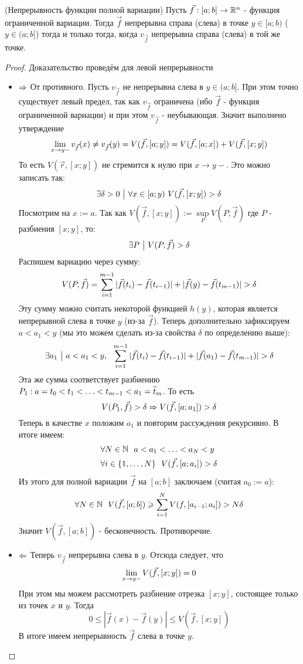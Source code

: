 \begin{theorem} (Непрерывность функции полной вариации)
	Пусть $\vec{f}: [a; b] \to \mathbb{R}^n$ - функция ограниченной вариации. Тогда $\vec{f}$ непрерывна справа (слева) в точке $y \in [a; b)$ ($y \in (a; b]$) тогда и только тогда, когда $v_{\vec{f}}$ непрерывна справа (слева) в той же точке.
\end{theorem}

\begin{proof}
	Доказательство проведём для левой непрерывности
	\begin{itemize}
		\item $\Rightarrow$ От противного. Пусть $v_{\vec{f}}$ не непрерывна слева в $y \in (a; b]$. При этом точно существует левый предел, так как $v_{\vec{f}}$ ограничена (ибо $\vec{f}$ - функция ограниченной вариации) и при этом $v_{\vec{f}}$ - неубывающая. Значит выполнено утверждение
		\[
			\lim\limits_{x \to y-} v_{\vec{f}}(x) \neq v_{\vec{f}}(y) = V(\vec{f}, [a; y]) = V(\vec{f}, [a; x]) + V(\vec{f}, [x; y])
		\]
		То есть $V(\vec{r}, [x; y])$ не стремится к нулю при $x \to y-$. Это можно записать так:
		\[
			\exists \delta > 0 \ \big|\  \forall x \in [a; y)\ V(\vec{f}, [x; y]) > \delta
		\]
		Посмотрим на $x := a$. Так как $V(\vec{f}, [x; y]) := \sup\limits_{P} V(P, \vec{f})$ где $P$ - разбиения $[x; y]$, то:
		\[
			\exists P \ \big|\  V(P, \vec{f}) > \delta
		\]
		Распишем вариацию через сумму:
		\[
			V(P, \vec{f}) = \sum\limits_{i = 1}^{m - 1} |\vec{f}(t_i) - \vec{f}(t_{i - 1})| + |\vec{f}(y) - \vec{f}(t_{m - 1})| > \delta
		\]
		Эту сумму можно считать некоторой функцией $h(y)$, которая является непрерывной слева в точке $y$ (из-за $\vec{f}$). Теперь дополнительно зафиксируем $a < a_1 < y$ (мы это можем сделать из-за свойства $\delta$ по определению выше):
		\[
			\exists a_1 \ \big|\  a < a_1 < y,\ \ \sum\limits_{i = 1}^{m - 1} |\vec{f}(t_i) - \vec{f}(t_{i - 1})| + |\vec{f}(a_1) - \vec{f}(t_{m - 1})| > \delta
		\]
		Эта же сумма соответствует разбиению $P_1: a = t_0 < t_1 < \ldots < t_{m - 1} < a_1 = \widetilde{t}_m$. То есть
		\[
			V(P_1, \vec{f}) > \delta \Rightarrow V(\vec{f}, [a; a_1]) > \delta
		\]
		Теперь в качестве $x$ положим $a_1$ и повторим рассуждения рекурсивно. В итоге имеем:
		\begin{align*}
			&{\forall N \in \mathbb{N}\ \ a < a_1 < \ldots < a_N < y}
			\\
			&{\forall i \in \{1, \ldots, N\}\ \ V(\vec{f}, [a; a_i]) > \delta}
		\end{align*}
		Из этого для полной вариации $\vec{f}$ на $[a; b]$ заключаем (считая $a_0 := a$):
		\[
			\forall N \in \mathbb{N}\ \ V(\vec{f}, [a; b]) \geqslant \sum\limits_{i = 1}^N V(f, [a_{i - 1}; a_i]) > N\delta
		\]
		Значит $V(\vec{f}, [a; b])$ - бесконечность. Противоречие.
		
		\item $\Leftarrow$ Теперь $v_{\vec{f}}$ непрерывна слева в $y$. Отсюда следует, что
		\[
			\lim\limits_{x \to y-} V(\vec{f}, [x; y]) = 0
		\]
		При этом мы можем рассмотреть разбиение отрезка $[x; y]$, состоящее только из точек $x$ и $y$. Тогда
		\[
			0 \le |\vec{f}(x) - \vec{f}(y)| \le V(\vec{f}, [x; y])
		\]
		В итоге имеем непрерывность $\vec{f}$ слева в точке $y$.
	\end{itemize}
\end{proof}

